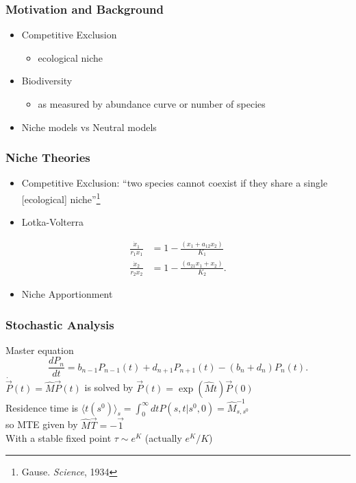 \documentclass{beamer}
\begin{document}
\begin{frame}
\frametitle{Motivation and Background}
\begin{itemize}
\item Competitive Exclusion
\begin{itemize}
	\item ecological niche
\end{itemize}
\pause
\item Biodiversity
\begin{itemize}
	\item as measured by abundance curve or number of species
\end{itemize}
\pause
\item Niche models vs Neutral models
\end{itemize}
\end{frame}


\begin{frame}
\frametitle{Niche Theories}
\begin{itemize}
\item Competitive Exclusion: ``two species cannot coexist if they share a single [ecological] niche''\footnote{Gause. \emph{Science}, 1934}
\pause
\item Lotka-Volterra
\end{itemize}
\begin{align*}
\frac{\dot{x}_1}{r_1 x_1} &= 1 - \frac{(x_1 + a_{12}x_2)}{K_1} \\
\frac{\dot{x}_2}{r_2 x_2} &= 1 - \frac{(a_{21}x_1 + x_2)}{K_2}. 
\end{align*}
\pause
\begin{itemize}
\item Niche Apportionment
\end{itemize}
\end{frame}


\begin{frame}
\frametitle{Stochastic Analysis}
Master equation
\begin{equation*}
\frac{dP_n}{dt} =  b_{n-1}P_{n-1}(t) + d_{n+1}P_{n+1}(t) - (b_n+d_n)P_n(t).
\end{equation*}
\pause
$\dot{\vec{P}}(t) = \hat{M}\vec{P}(t)$ is solved by $\vec{P}(t)=\exp\left(\hat{M}t\right)\vec{P}(0)$ \\
\pause
Residence time is $\langle t(s^0)\rangle_s = \int_0^{\infty} dt P(s,t|s^0,0)=\hat{M}^{-1}_{s,s^0}$ \\
so MTE given by $\hat{M}\vec{T}=-\vec{1}$ \\
\pause
With a stable fixed point $\tau \sim e^K$ (actually $e^K/K$)
\end{frame}
\end{document}
